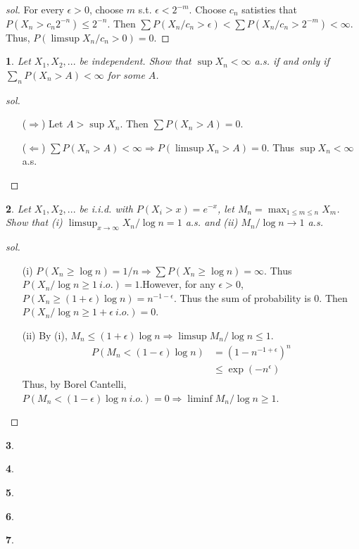 \documentclass{report}
\newtheorem{ex}{}[section]
\begin{document}
\begin{proof}[sol]
For  every $\epsilon > 0$, choose $m$ s.t. $\epsilon < 2^{-m}$. Choose $c_n$ satisties that $P(X_n > c_n2^{-n}) \le 2^{-n}$. Then $\sum P(X_n / c_n > \epsilon) < \sum P(X_n / c_n > 2^{-m}) < \infty$. Thus, $P(\limsup X_n / c_n > 0) = 0$.
\end{proof}
\begin{ex}
Let $X_1,X_2,...$ be independent. Show that $\sup X_n < \infty$ a.s. if and only if $\sum_n P(X_n > A) < \infty$ for some $A$.
\end{ex}
\begin{proof}[sol]~\
\begin{enumerate}
	\item[($\Rightarrow$)] Let $A > \sup X_n$. Then $\sum P(X_n > A) = 0$.
	\item[($\Leftarrow$)] $\sum P(X_n > A) < \infty \Rightarrow P(\limsup X_n > A) = 0$. Thus $\sup X_n < \infty$ a.s.
\end{enumerate}
\end{proof}
\begin{ex}
Let $X_1, X_2,...$ be i.i.d. with $P(X_i > x)  = e^{-x}$, let $M_n = \max_{1\le m \le n} X_m$. Show that (i) $\limsup_{x\to\infty} X_n / \log n = 1$ a.s. and (ii) $M_n / \log n \to 1$ a.s.
\end{ex}
\begin{proof}[sol]~\
\begin{enumerate}
\item[(i)] $P(X_n \ge \log n) = 1/n \Rightarrow \sum P(X_n \ge \log n) = \infty$. Thus $P(X_n/\log n \ge 1\ i.o.) = 1$.However, for any $\epsilon > 0$, $P(X_n \ge (1 + \epsilon )\log n) = n^{-1-\epsilon}$. Thus the sum of probability is 0. Then $P( X_n/\log n \ge 1 + \epsilon\ i.o.) = 0$.
\item[(ii)] By (i), $M_n \le (1+\epsilon)\log n \Rightarrow \limsup M_n/\log n \le 1$.
\begin{align*}
P(M_n < (1-\epsilon)\log n) &= (1 - n^{-1+\epsilon})^n\\
&\le \exp(-n^\epsilon)
\end{align*}
Thus, by Borel Cantelli, $P(M_n < (1-\epsilon)\log n\ i.o.) = 0 \Rightarrow \liminf M_n/\log n \ge 1$.
\end{enumerate}
\end{proof}
\begin{ex}
\end{ex}
\begin{ex}
\end{ex}
\begin{ex}
\end{ex}
\begin{ex}
\end{ex}
\begin{ex}
\end{ex}
\end{document}
